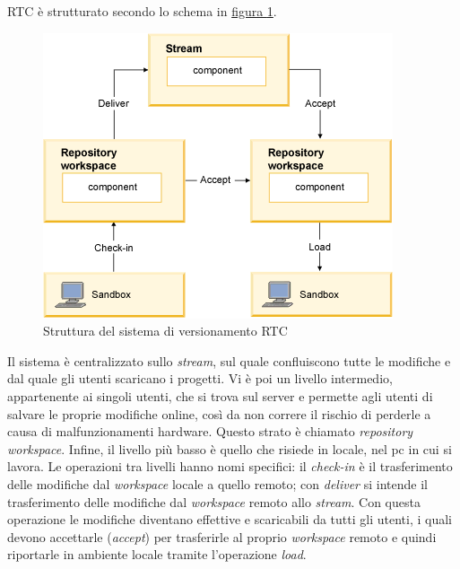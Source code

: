 RTC è strutturato secondo lo schema in \hyperref[fig:rtc-struttura]{figura \ref{fig:rtc-struttura}}.
\begin{figure}[H]
	\centering
	\includegraphics{Immagini/rtc-struttura.png}
	\caption{Struttura del sistema di versionamento RTC}
	\label{fig:rtc-struttura}
\end{figure}
Il sistema è centralizzato sullo \textit{stream}, sul quale confluiscono tutte le modifiche e dal quale gli utenti scaricano i progetti. Vi è poi un livello intermedio, appartenente ai singoli utenti, che si trova sul server e permette agli utenti di salvare le proprie modifiche online, così da non correre il rischio di perderle a causa di malfunzionamenti hardware. Questo strato è chiamato \textit{repository workspace}. Infine, il livello più basso è quello che risiede in locale, nel pc in cui si lavora. Le operazioni tra livelli hanno nomi specifici: il \textit{check-in} è il trasferimento delle modifiche dal \textit{workspace} locale a quello remoto; con \textit{deliver} si intende il trasferimento delle modifiche dal \textit{workspace} remoto allo \textit{stream}. Con questa operazione le modifiche diventano effettive e scaricabili da tutti gli utenti, i quali devono accettarle (\textit{accept}) per trasferirle al proprio \textit{workspace} remoto e quindi riportarle in ambiente locale tramite l'operazione \textit{load}.

